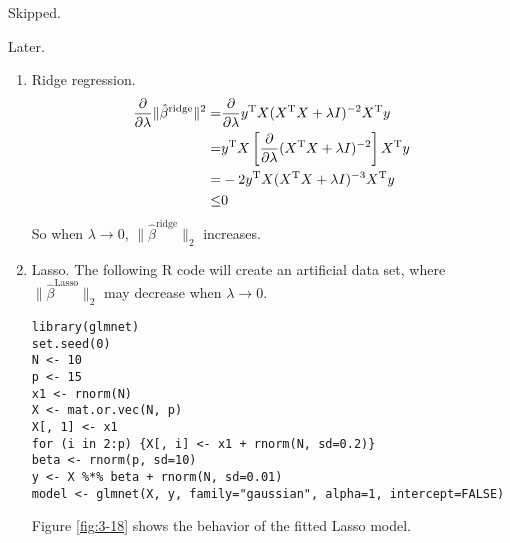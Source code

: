 \begin{sol}
Skipped.
\end{sol}

\begin{sol}
	Later.
\end{sol}

\begin{sol}
\begin{enumerate}
\item Ridge regression.
\begin{align*}
	\frac{\partial}{\partial \lambda}\|\hat{\beta}^{\mathrm{ridge}}\|^2 = & \frac{\partial}{\partial \lambda}y^{\mathrm{T}}X(X^{\mathrm{T}}X+\lambda I)^{-2}X^{\mathrm{T}}y\\
	=& y^{\mathrm{T}}X\left[\frac{\partial}{\partial \lambda} (X^{\mathrm{T}}X+\lambda I)^{-2}\right]X^{\mathrm{T}}y\\
	=& -2y^{\mathrm{T}}X(X^{\mathrm{T}}X+\lambda I)^{-3}X^{\mathrm{T}}y\\
	\le & 0
\end{align*}
So when $\lambda\to 0$, $\|\hat{\beta}^{\mathrm{ridge}}\|_2$ increases.

\item Lasso. The following R code will create an artificial data set, where $\|\hat{\beta}^{\mathrm{Lasso}}\|_2$ may decrease when $\lambda\to 0$.
\begin{verbatim}
library(glmnet)
set.seed(0)
N <- 10
p <- 15
x1 <- rnorm(N)
X <- mat.or.vec(N, p)
X[, 1] <- x1
for (i in 2:p) {X[, i] <- x1 + rnorm(N, sd=0.2)}
beta <- rnorm(p, sd=10)
y <- X %*% beta + rnorm(N, sd=0.01)
model <- glmnet(X, y, family="gaussian", alpha=1, intercept=FALSE)
\end{verbatim}

Figure \ref{fig:3-18} shows the behavior of the fitted Lasso model.\\


\end{enumerate}
\end{sol}
